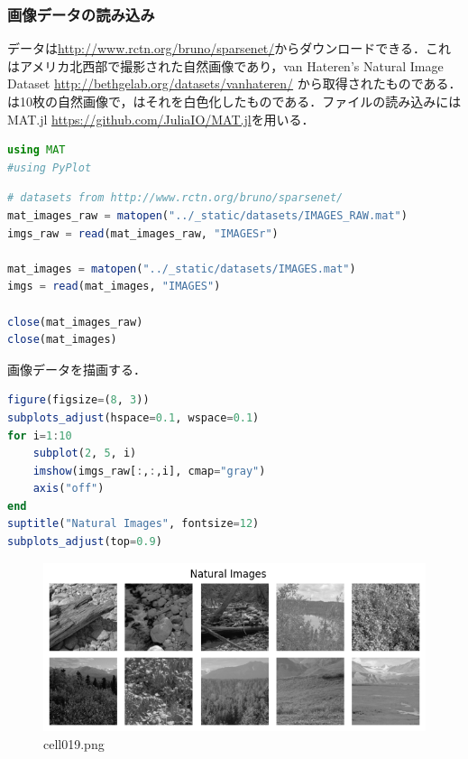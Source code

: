 \subsubsection{画像データの読み込み}
データは\url{http://www.rctn.org/bruno/sparsenet/}からダウンロードできる．これはアメリカ北西部で撮影された自然画像であり，van Hateren's Natural Image Dataset \url{http://bethgelab.org/datasets/vanhateren/} から取得されたものである．は10枚の自然画像で，はそれを白色化したものである．ファイルの読み込みには MAT.jl \url{https://github.com/JuliaIO/MAT.jl}を用いる．
\begin{lstlisting}[language=julia]
using MAT
#using PyPlot
\end{lstlisting}
\begin{lstlisting}[language=julia]
# datasets from http://www.rctn.org/bruno/sparsenet/
mat_images_raw = matopen("../_static/datasets/IMAGES_RAW.mat")
imgs_raw = read(mat_images_raw, "IMAGESr")

mat_images = matopen("../_static/datasets/IMAGES.mat")
imgs = read(mat_images, "IMAGES")

close(mat_images_raw)
close(mat_images)
\end{lstlisting}
画像データを描画する．
\begin{lstlisting}[language=julia]
figure(figsize=(8, 3))
subplots_adjust(hspace=0.1, wspace=0.1)
for i=1:10
    subplot(2, 5, i)
    imshow(imgs_raw[:,:,i], cmap="gray")
    axis("off")
end
suptitle("Natural Images", fontsize=12)
subplots_adjust(top=0.9)  
\end{lstlisting}
\begin{figure}[ht]
	\centering
	\includegraphics[scale=0.8, max width=\linewidth]{./fig/energy-based-model/sparse-coding/cell019.png}
	\caption{cell019.png}
	\label{cell019.png}
\end{figure}
